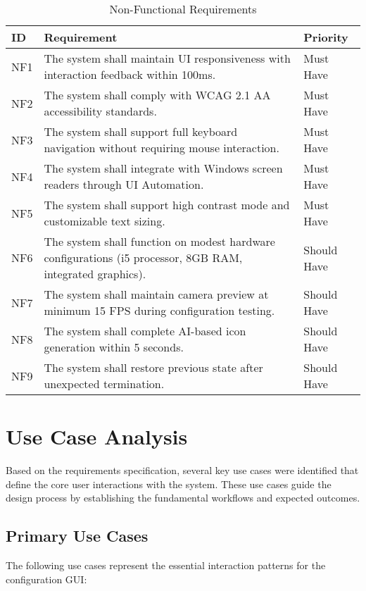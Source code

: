 \begin{table}[h]
\centering
\begin{tabular}{|p{1cm}|p{7cm}|p{3cm}|}
\hline
\textbf{ID} & \textbf{Requirement} & \textbf{Priority} \\
\hline
NF1 & The system shall maintain UI responsiveness with interaction feedback within 100ms. & Must Have \\
\hline
NF2 & The system shall comply with WCAG 2.1 AA accessibility standards. & Must Have \\
\hline
NF3 & The system shall support full keyboard navigation without requiring mouse interaction. & Must Have \\
\hline
NF4 & The system shall integrate with Windows screen readers through UI Automation. & Must Have \\
\hline
NF5 & The system shall support high contrast mode and customizable text sizing. & Must Have \\
\hline
NF6 & The system shall function on modest hardware configurations (i5 processor, 8GB RAM, integrated graphics). & Should Have \\
\hline
NF7 & The system shall maintain camera preview at minimum 15 FPS during configuration testing. & Should Have \\
\hline
NF8 & The system shall complete AI-based icon generation within 5 seconds. & Should Have \\
\hline
NF9 & The system shall restore previous state after unexpected termination. & Should Have \\
\hline
\end{tabular}
\caption{Non-Functional Requirements}
\label{tab:nonfunctional_requirements}
\end{table}

\section{Use Case Analysis}
Based on the requirements specification, several key use cases were identified that define the core user interactions with the system. These use cases guide the design process by establishing the fundamental workflows and expected outcomes.

\subsection{Primary Use Cases}
The following use cases represent the essential interaction patterns for the configuration GUI:

